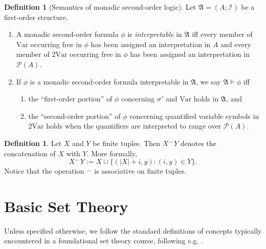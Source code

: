 \documentclass[12pt, twoside]{memoir}
\numberwithin{equation}{section}
\theoremstyle{definition}
\newtheorem{defi}[thm]{Definition}
\theoremstyle{remark}
\theoremstyle{definition}
\theoremstyle{definition}
\theoremstyle{definition}
\theoremstyle{remark}
\begin{document}
\begin{defi}[Semantics of monadic second-order logic]
Let $\mathfrak{A} = (A; \mathcal{I})$ be a first-order structure.
\begin{enumerate}[label=(\arabic*)]
    \item A monadic second-order formula $\phi$ is \emph{interpretable} in $\mathfrak{A}$ iff every member of $\mathrm{Var}$ occurring free in $\phi$ has been assigned an interpretation in $A$ and every member of $\mathrm{2Var}$ occurring free in $\phi$ has been assigned an interpretation in $\mathcal{P}(A)$.
    \item If $\phi$ is a monadic second-order formula interpretable in $\mathfrak{A}$, we say $\mathfrak{A} \models \phi$ iff 
    \begin{enumerate}[label=(\alph*)]
        \item the ``first-order portion'' of $\phi$ concerning $\sigma'$ and $\mathrm{Var}$ holds in $\mathfrak{A}$, and
        \item the ``second-order portion'' of $\phi$ concerning quantified variable symbols in $\mathrm{2Var}$ holds when the quantifiers are interpreted to range over $\mathcal{P}(A)$.
    \end{enumerate}
\end{enumerate}
\end{defi}

\begin{defi}
Let $X$ and $Y$ be finite tuples. Then $X^\frown Y$ denotes the concatenation of $X$ with $Y$. More formally, 
\begin{equation*}
    X^\frown Y := X \cup \{(|X|+i, y) : (i, y) \in Y\} \text{.}
\end{equation*}
Notice that the operation $^\frown$ is associative on finite tuples.
\end{defi}

\section{Basic Set Theory}

Unless specified otherwise, we follow the standard definitions of concepts typically encountered in a foundational set theory course, following e.g. \cite{jechhrbacek}.
\end{document}
